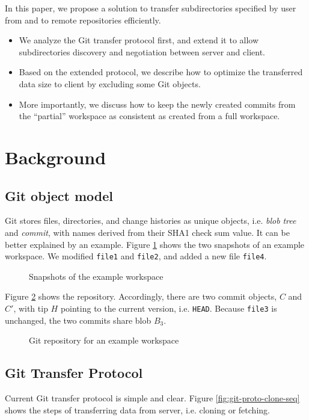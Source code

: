 \documentclass[preprint]{sigplanconf}
\begin{document}
In this paper, we propose a solution to transfer subdirectories specified by
user from and to remote repositories efficiently.

\begin{itemize}
  \item We analyze the Git transfer protocol first, and extend it to allow
      subdirectories discovery and negotiation between server and client.

  \item Based on the extended protocol, we describe how to optimize the
      transferred data size to client by excluding some Git objects.

  \item More importantly, we discuss how to keep the newly created commits from
      the ``partial'' workspace as consistent as created from a full workspace.
\end{itemize}

\section{Background}
\subsection{Git object model}
Git stores files, directories, and change histories as unique objects, i.e.
\emph{blob} \emph{tree} and \emph{commit}, with names derived from their SHA1
check sum value\cite{gitobj}.
It can be better explained by an example.
Figure \ref{fig:workspace} shows the two snapshots of an example workspace.
We modified \verb|file1| and \verb|file2|, and added a new file \verb|file4|.
\begin{figure}[htpb]
  \centering
  
  \caption{Snapshots of the example workspace}
  \label{fig:workspace}
\end{figure}

Figure \ref{fig:git-repo} shows the repository.
Accordingly, there are two commit objects, $C$ and $C'$, with tip $H$ pointing
to the current version, i.e. \verb|HEAD|.
Because \verb|file3| is unchanged, the two commits share blob $B_3$.

\begin{figure}[htpb]
  \centering
  
  \caption{Git repository for an example workspace}
  \label{fig:git-repo}
\end{figure}

\subsection{Git Transfer Protocol}
Current Git transfer protocol is simple and clear\cite{tran-protocol}.
Figure \ref{fig:git-proto-clone-seq} shows the steps of transferring data from
server, i.e. cloning or fetching.
\end{document}
